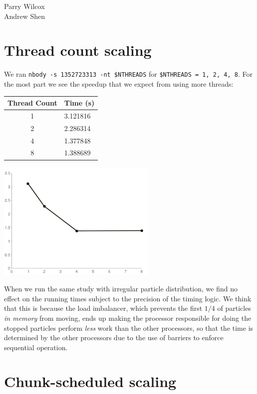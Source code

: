 \documentclass{article}[12pt;letterpaper]
\begin{document}
\begin{flushleft}
Parry Wilcox \\
Andrew Shen
\end{flushleft}

\section{Thread count scaling}

We ran \texttt{nbody -s 1352723313 -nt \$NTHREADS} for \texttt{\$NTHREADS = 1,
2, 4, 8}. For the most part we see the speedup that we expect from using more
threads:

\begin{center}\begin{tabular}{c l}
Thread Count & Time (s) \\
\hline{}
1 & 3.121816 \\
2 & 2.286314 \\
4 & 1.377848 \\
8 & 1.388689
\end{tabular}

\includegraphics[width=3in]{a2_sec1_1.png}
\end{center}

When we run the same study with irregular particle distribution, we find no
effect on the running times subject to the precision of the timing logic. We
think that this is because the load imbalancer, which prevents the first $1/4$
of particles \textit{in memory} from moving, ends up making the processor
responsible for doing the stopped particles perform \textit{less} work than
the other processors, so that the time is determined by the other processors
due to the use of barriers to enforce sequential operation.

\section{Chunk-scheduled scaling}
\end{document}
